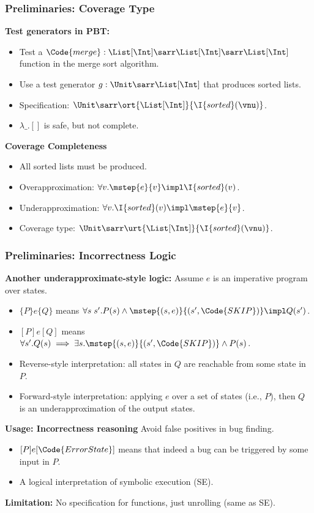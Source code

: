 \newcommand{\store}[1]{\langle #1 \rangle}

\begin{frame}[fragile]
    \frametitle{Preliminaries: Coverage Type}

\textbf{Test generators in PBT:} 
\begin{itemize}
    \item Test a $\Code{merge}: \List[\Int] \sarr \List[\Int] \sarr \List[\Int]$ function in the merge sort algorithm.
    \item Use a test generator $g: \Unit \sarr \List[\Int]$ that produces sorted lists.
    \item Specification: $\Unit \sarr \ort{\List[\Int]}{\I{sorted}(\vnu)}$.
    \item $\lambda \_. []$ is safe, but not complete.
\end{itemize}

\textbf{Coverage Completeness} 
\begin{itemize}
    \item All sorted lists must be produced.
    \item Overapproximation: $\forall v. \mstep{e}{v} \impl \I{sorted}(v)$.
    \item Underapproximation: $\forall v. \I{sorted}(v) \impl \mstep{e}{v}$.
    \item Coverage type: $\Unit \sarr \urt{\List[\Int]}{\I{sorted}(\vnu)}$. 
\end{itemize}
        
\end{frame}

\begin{frame}[fragile]
    \frametitle{Preliminaries: Incorrectness Logic}

\textbf{Another underapproximate-style logic:} Assume $e$ is an imperative program over states.
\begin{itemize}
    \item $\{P\} e \{Q\}$ means $\forall s\;s'. P(s) \land \mstep{(s, e)}{(s', \Code{SKIP})} \impl Q(s')$.
    \item $[P] e [Q]$ means $\forall s'. Q(s) \implies \exists s. \mstep{(s, e)}{(s', \Code{SKIP})} \land P(s)$.
    \item Reverse-style interpretation: all states in $Q$ are reachable from some state in $P$.
    \item Forward-style interpretation: applying $e$ over a set of states (i.e., $P$), then $Q$ is an underapproximation of the output states.
\end{itemize}

\textbf{Usage: Incorrectness reasoning} Avoid false positives in bug finding.
\begin{itemize}
    \item $[P] e [\Code{ErrorState}]$ means that indeed a bug can be triggered by some input in $P$.
    \item A logical interpretation of symbolic execution (SE).
\end{itemize}

\textbf{Limitation:} No specification for functions, just unrolling (same as SE).   
\end{frame}

